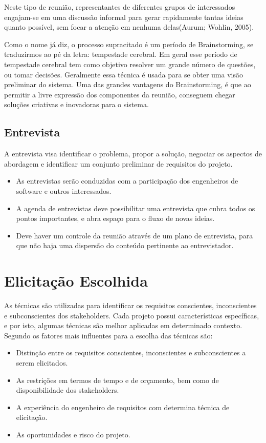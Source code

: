 Neste tipo de reunião, representantes de diferentes grupos de interessados engajam-se em uma discussão informal para gerar rapidamente tantas
ideias quanto possível, sem focar a atenção em nenhuma delas(Aurum; Wohlin, 2005).

Como o nome já diz, o processo supracitado é um período de Brainstorming, se traduzirmos ao pé da letra: tempestade cerebral. Em geral esse período de tempestade cerebral tem como objetivo resolver um grande número de questões, ou tomar decisões. Geralmente essa técnica é usada para se obter uma visão preliminar do sistema. Uma das grandes vantagens do Brainstorming, é que ao permitir a livre expressão dos componentes da reunião, conseguem chegar soluções criativas e inovadoras para o sistema.

\subsection{Entrevista}

A entrevista visa identificar o problema, propor a solução, negociar os aspectos de abordagem e identificar um conjunto preliminar  de requisitos do projeto. \cite{moraes}

\begin{itemize}
\item As entrevistas serão conduzidas com a participação dos engenheiros de software e outros interessados.
\item A agenda de entrevistas deve possibilitar uma entrevista que cubra todos os pontos importantes,  e abra espaço para o fluxo de novas ideias.
\item Deve haver  um controle da reunião através de um plano de entrevista, para que não haja uma dispersão do conteúdo pertinente ao entrevistador.
\end{itemize}

\section{Elicitação Escolhida}

As técnicas são utilizadas para identificar os requisitos conscientes, inconscientes e subconscientes dos stakeholders. Cada projeto possui características específicas, e por isto, algumas técnicas são melhor aplicadas em determinado contexto. Segundo \cite{pohl} os fatores mais influentes para a escolha das técnicas são:

\begin{itemize}
\item Distinção entre os requisitos conscientes, inconscientes e subconscientes a serem elicitados.
\item As restrições em termos de tempo e de orçamento, bem como de disponibilidade dos stakeholders.
\item A experiência do engenheiro de requisitos com determina técnica de elicitação.
\item As oportunidades e risco do projeto.
\end{itemize}

